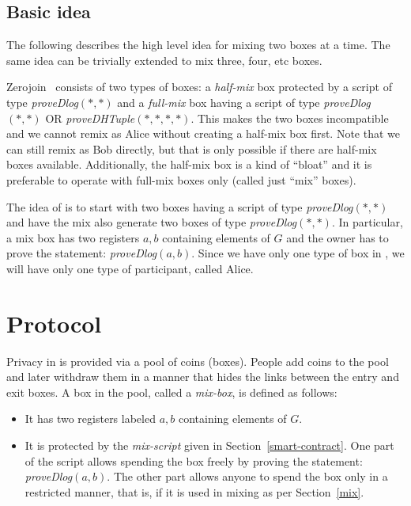 \documentclass[runningheads]{llncs}
\newcommand{\zerojoin}{Zerojoin\xspace}
\begin{document}
\subsection{Basic idea}
The following describes the high level idea for mixing two boxes at a time. The same idea can be trivially extended to mix three, four, etc boxes.

\zerojoin~\cite{zerojoin} consists of two types of boxes: a {\em half-mix} box protected by a script of type {\em proveDlog$(*, *)$} and a {\em full-mix} box having a script of type {\em proveDlog$(*, *)$} \textsf{OR} {\em proveDHTuple$(*, *, *, *)$}. This makes the two boxes incompatible and we cannot remix as Alice without creating a half-mix box first. Note that we can still remix as Bob directly, but that is only possible if there are half-mix boxes available.
Additionally, the half-mix box is a kind of ``bloat'' and it is preferable to operate with full-mix boxes only (called just ``mix'' boxes).

The idea of \algname is to start with two boxes having a script of type {\em proveDlog$(*, *)$} and have the mix also generate two boxes of type {\em proveDlog$(*, *)$}. In particular, a mix box has two registers $a, b$ containing elements of $G$ and the owner has to prove the statement: {\em proveDlog$(a, b)$}.
Since we have only one type of box in \algname, we will have only one type of participant, called Alice.

\section{\algname Protocol}

Privacy in \algname is provided via a pool of coins (boxes). People add coins to the pool and later withdraw them in a manner that hides the links between the entry and exit boxes.
A box in the pool, called a {\em mix-box}, is defined as follows:
\begin{itemize}
    \item It has two registers labeled $a, b$ containing elements of $G$.
    \item It is protected by the {\em mix-script} given in Section~\ref{smart-contract}. One part of the script allows spending the box freely by proving the statement: {\em proveDlog$(a,b)$}. The other part allows anyone to spend the box only in a restricted manner, that is, if it is used in mixing as per Section~\ref{mix}.
\end{itemize}
\end{document}
